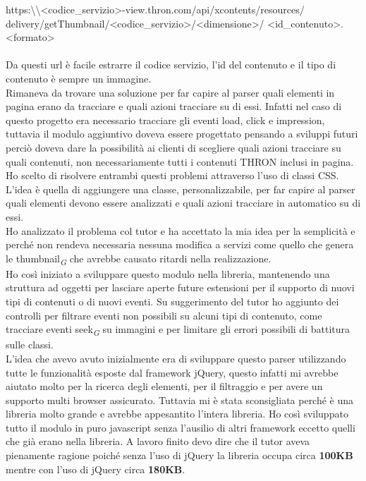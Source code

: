\documentclass[a4paper, 12pt, twoside, openright]{book}
\newcommand{\gloss}[1]{#1\textsubscript{\textit{\tiny{G}}}}
\begin{document}
{\fontsize{10}{12}\selectfont https:\textbackslash\textbackslash<codice\_servizio>-view.thron.com/api/xcontents/resources/
delivery/getThumbnail/<codice\_servizio>/<dimensione>/
<id\_contenuto>.<formato>}
\\ \\
Da questi url è facile estrarre il codice servizio, l'id del contenuto e il tipo di contenuto è sempre un immagine.\\
Rimaneva da trovare una soluzione per far capire al parser quali elementi in pagina erano da tracciare e quali azioni tracciare su di essi. Infatti nel caso di questo progetto era necessario tracciare gli eventi load, click e impression, tuttavia il modulo aggiuntivo doveva essere progettato pensando a sviluppi futuri perciò doveva dare la possibilità ai clienti di scegliere quali azioni tracciare su quali contenuti, non necessariamente tutti i contenuti THRON inclusi in pagina.\\
Ho scelto di risolvere entrambi questi problemi attraverso l'uso di classi CSS. L'idea è quella di aggiungere una classe, personalizzabile, per far capire al parser quali elementi devono essere analizzati e quali azioni tracciare in automatico su di essi.\\
Ho analizzato il problema col tutor e ha accettato la mia idea per la semplicità e perché non rendeva necessaria nessuna modifica a servizi come quello che genera le \gloss{thumbnail} che avrebbe causato ritardi nella realizzazione.\\
Ho così iniziato a sviluppare questo modulo nella libreria, mantenendo una struttura ad oggetti per lasciare aperte future estensioni per il supporto di nuovi tipi di contenuti o di nuovi eventi. Su suggerimento del tutor ho aggiunto dei controlli per filtrare eventi non possibili su alcuni tipi di contenuto, come tracciare eventi \gloss{seek} su immagini e per limitare gli errori possibili di battitura sulle classi.\\
L'idea che avevo avuto inizialmente era di sviluppare questo parser utilizzando tutte le funzionalità esposte dal framework jQuery, questo infatti mi avrebbe aiutato molto per la ricerca degli elementi, per il filtraggio e per avere un supporto multi browser assicurato. Tuttavia mi è stata sconsigliata perché è una libreria molto grande e avrebbe appesantito l'intera libreria. Ho così sviluppato tutto il modulo in puro javascript senza l'ausilio di altri framework eccetto quelli che già erano nella libreria. A lavoro finito devo dire che il tutor aveva pienamente ragione poiché senza l'uso di jQuery la libreria occupa circa \textbf{100KB} mentre con l'uso di jQuery circa \textbf{180KB}.\\
\end{document}
